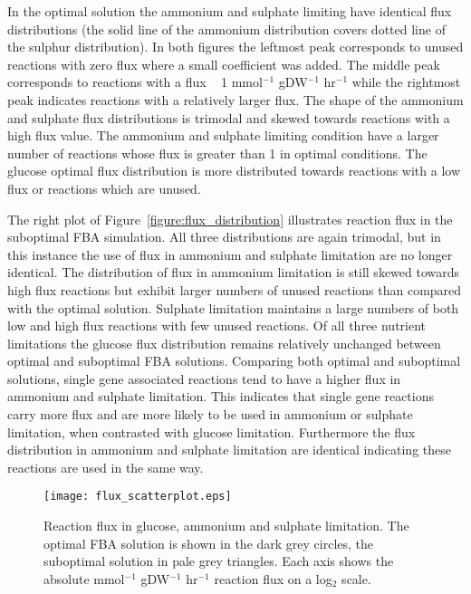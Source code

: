 In the optimal solution the ammonium and sulphate limiting have identical flux distributions (the solid line of the ammonium distribution covers dotted line of the sulphur distribution). In both figures the leftmost peak corresponds to unused reactions with zero flux where a small coefficient was added. The middle peak corresponds to reactions with a flux ~ 1 mmol$^{-1}$ gDW$^{-1}$ hr$^{-1}$ while the rightmost peak indicates reactions with a relatively larger flux. The shape of the ammonium and sulphate flux distributions is trimodal and skewed towards reactions with a high flux value. The ammonium and sulphate limiting condition have a larger number of reactions whose flux is greater than 1 in optimal conditions. The glucose optimal flux distribution is more distributed towards reactions with a low flux or reactions which are unused.

The right plot of Figure~\ref{figure:flux_distribution} illustrates reaction flux in the suboptimal FBA simulation. All three distributions are again trimodal, but in this instance the use of flux in ammonium and sulphate limitation are no longer identical. The distribution of flux in ammonium limitation is still skewed towards high flux reactions but exhibit larger numbers of unused reactions than compared with the optimal solution. Sulphate limitation maintains a large numbers of both low and high flux reactions with few unused reactions. Of all three nutrient limitations the glucose flux distribution remains relatively unchanged between optimal and suboptimal FBA solutions. Comparing both optimal and suboptimal solutions, single gene associated reactions tend to have a higher flux in ammonium and sulphate limitation.  This indicates that single gene reactions carry more flux and are more likely to be used in ammonium or sulphate limitation, when contrasted with glucose limitation. Furthermore the flux distribution in ammonium and sulphate limitation are identical indicating these reactions are used in the same way.

\begin{figure}%
  \centering
  \texttt{[image: flux\_scatterplot.eps]}
  \caption[Reaction flux in glucose, ammonium and sulphate limitation]{Reaction flux in glucose, ammonium and sulphate limitation. The optimal FBA solution is shown in the dark grey circles, the suboptimal solution in pale grey triangles. Each axis shows the absolute mmol$^{-1}$ gDW$^{-1}$ hr$^{-1}$ reaction flux on a log$_2$ scale. }
  \label{figure:flux_comparison}
\end{figure}%

